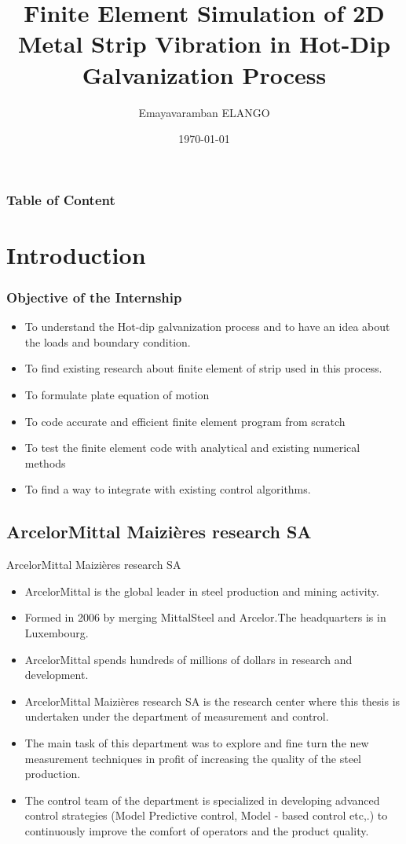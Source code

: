 \documentclass[9pt]{beamer}
\title{Finite Element Simulation of 2D Metal Strip Vibration in
Hot-Dip Galvanization Process}
\author{Emayavaramban ELANGO}
\institute{\'Ecole centrale De Nantes}
\date{\today}
\begin{document}

\frame{\titlepage}


\begin{frame}
\frametitle{Table of Content}
\tableofcontents
\end{frame}
\section{Introduction}

\begin{frame}
\frametitle{Objective of the Internship}
\begin{itemize}
\item To understand the Hot-dip galvanization process and to have an idea about the loads and boundary condition.
\item To find existing research about finite element of strip used in this process.
\item To formulate plate equation of motion
\item To code accurate and efficient finite element program from scratch
\item To test the finite element code with analytical and existing numerical methods
\item To find a way to integrate with existing control algorithms.
 


\end{itemize}

\end{frame}


\subsection{ArcelorMittal Maizi\`eres research SA}
\begin{frame}{ArcelorMittal Maizi\`eres research SA}
\begin{itemize}
\item ArcelorMittal is the global leader in steel production and mining activity.
\item Formed in 2006 by merging MittalSteel and Arcelor.The headquarters is in Luxembourg.
\item ArcelorMittal spends hundreds of millions of dollars in research and development.
\item ArcelorMittal Maizi\`eres research SA is the research center where this thesis is undertaken under the department of measurement and control.
\item The main task of this department was to explore and fine turn the new measurement techniques in profit of increasing the quality of the steel production. 
\item The control team of the department is specialized in developing advanced control strategies (Model Predictive control, Model - based control etc,.) to continuously improve the comfort of operators and the product quality.


\end{itemize}

\end{frame}
\end{document}

